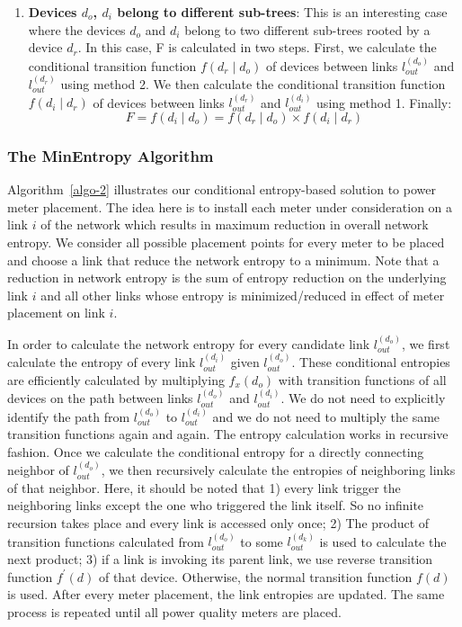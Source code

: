 \begin{enumerate}
\item \textbf{Devices $d_o$, $d_i$ belong to different sub-trees}:
This is an interesting case where the devices $d_o$ and $d_i$ belong to two different sub-trees rooted by a device $d_r$. In this case, F is calculated in two steps. First, we calculate the conditional transition function $f(d_r \mid d_o)$ of devices between links $l_{out}^{(d_o)}$ and $l_{out}^{(d_r)}$ using method 2. We then calculate the conditional transition function $f(d_i \mid d_r)$ of devices between links $l_{out}^{(d_r)}$ and $l_{out}^{(d_i)}$ using method 1. Finally: 
\[F = f(d_i \mid d_o) = f(d_r \mid d_o) \times f(d_i \mid d_r)\]
\end{enumerate}

\subsubsection{The MinEntropy Algorithm}
Algorithm~\ref{algo-2} illustrates our conditional entropy-based solution to power meter placement. The idea here is to install each meter under consideration on a link $i$ of the network which results in maximum reduction in overall network entropy. We consider all possible placement points for every meter to be placed and choose a link that reduce the network entropy to a minimum. Note that a reduction in network entropy is the sum of entropy reduction on the underlying link $i$ and all other links whose entropy is minimized/reduced in effect of meter placement on link $i$.

In order to calculate the network entropy for every candidate link $l_{out}^{(d_o)}$, we first calculate the entropy of every link $l_{out}^{(d_i)}$ given $l_{out}^{(d_o)}$. These conditional entropies are efficiently calculated by multiplying $f_x(d_o)$ with transition functions of all devices on the path between links $l_{out}^{(d_o)}$ and $l_{out}^{(d_i)}$. We do not need to explicitly identify the path from $l_{out}^{(d_o)}$ to $l_{out}^{(d_i)}$ and we do not need to multiply the same transition functions again and again. The entropy calculation works in recursive fashion. Once we calculate the conditional entropy for a directly connecting neighbor of $l_{out}^{(d_o)}$, we then recursively calculate the entropies of neighboring links of that neighbor. Here, it should be noted that 1) every link trigger the neighboring links except the one who triggered the link itself. So no infinite recursion takes place and every link is accessed only once; 2) The product of transition functions calculated from $l_{out}^{(d_o)}$ to some $l_{out}^{(d_k)}$ is used to calculate the next product; 3) if a link is invoking its parent link, we use reverse transition function $f^\prime(d)$ of that device. Otherwise, the normal transition function $f(d)$ is used. After every meter placement, the link entropies are updated. The same process is repeated until all power quality meters are placed.



